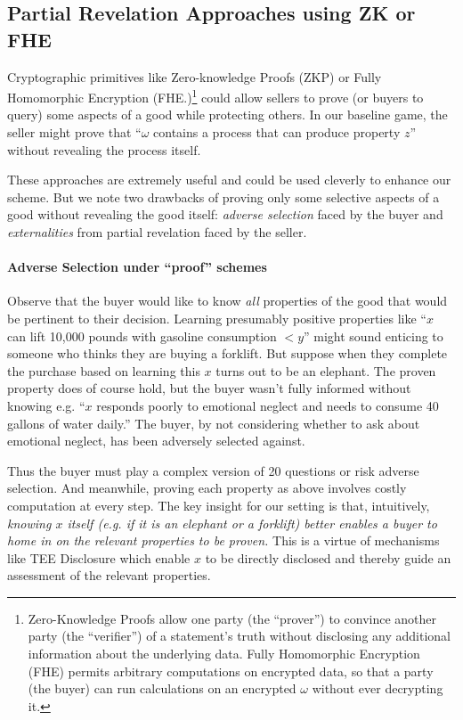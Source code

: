 \documentclass{article}
\begin{document}
\subsection{Partial Revelation Approaches using ZK or FHE}
Cryptographic primitives like Zero-knowledge Proofs (ZKP) or Fully Homomorphic Encryption (FHE.)\footnote{Zero-Knowledge Proofs allow one party (the ``prover'') to convince another party (the ``verifier'') of a statement’s truth without disclosing any additional information about the underlying data. Fully Homomorphic Encryption (FHE) permits arbitrary computations on encrypted data, so that a party (the buyer) can run calculations on an encrypted $\omega$ 
without ever decrypting it.} could allow sellers to prove (or buyers to query) some aspects of a good while protecting others. In our baseline game, the seller might prove that ``$\omega$ contains a process that can produce property $z$'' without revealing the process itself. 

These approaches are extremely useful and could be used cleverly to enhance our scheme. But we note two drawbacks of proving only some selective aspects of a good without revealing the good itself: \emph{adverse selection} faced by the buyer and \emph{externalities} from partial revelation faced by the seller.

\paragraph{Adverse Selection under ``proof'' schemes} Observe that the buyer would like to know  \emph{all} properties of the good that would be pertinent to their decision. Learning presumably positive properties like ``$x$ can lift 10,000 pounds with gasoline consumption $<y$'' might sound enticing to someone who thinks they are buying a forklift. But suppose when they complete the purchase based on learning this $x$ turns out to be an elephant. The proven property does of course hold, but the buyer wasn't fully informed without knowing e.g. ``$x$ responds poorly to emotional neglect and needs to consume 40 gallons of water daily.'' The buyer, by not considering whether to ask about emotional neglect, has been adversely selected against. 

Thus the buyer must play a complex version of 20 questions or risk adverse selection. And meanwhile, proving each property as above involves costly computation at every step. The key insight for our setting is that, intuitively, \emph{knowing $x$ itself (e.g. if it is an elephant or a forklift) better enables a buyer to home in on the relevant properties to be proven.} This is a virtue of mechanisms like TEE Disclosure which enable $x$ to be directly disclosed and thereby guide an assessment of the relevant properties.
\end{document}
